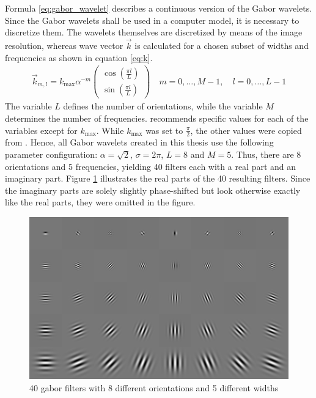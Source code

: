 \documentclass[11pt, a4paper]{article}
\begin{document}
Formula \eqref{eq:gabor_wavelet} describes a continuous version of the Gabor wavelets. Since the Gabor wavelets shall be used in a computer model, it is necessary to discretize them. The wavelets themselves are discretized by means of the image resolution, whereas wave vector $\vec{k}$ is calculated for a chosen subset of widths and frequencies as shown in equation \eqref{eq:k}. 
\begin{align}
\label{eq:k}
\vec{k}_{m,l} = k_\text{max} \alpha^{-m} \begin{pmatrix}\cos\left(\frac{\pi l}{L}\right)\\ \sin\left(\frac{\pi l}{L}\right)\end{pmatrix} \quad m = 0, \ldots, M - 1, \quad l = 0, \ldots, L-1
\end{align}
The variable $L$ defines the number of orientations, while the variable $M$ determines the number of frequencies. \cite{ebgm} recommends specific values for each of the variables except for $k_\text{max}$. While $k_\text{max}$ was set to $\frac{\pi}{2}$, the other values were copied from \cite{ebgm}. Hence, all Gabor wavelets created in this thesis use the following parameter configuration: $\alpha = \sqrt{2}$, $\sigma = 2\pi$, $L = 8$ and $M = 5$. Thus, there are 8 orientations and 5 frequencies, yielding 40 filters each with a real part and an imaginary part. Figure \ref{fig:gabor_filters} illustrates the real parts of the 40 resulting filters. Since the imaginary parts are solely slightly phase-shifted but look otherwise  exactly like the real parts, they were omitted in the figure.
\begin{figure}[htbp]
	\centering
	\includegraphics[width=\textwidth]{gabor_filters_normalized_filterwise_real.png}
	\caption{40 gabor filters with 8 different orientations and 5 different widths}
	\label{fig:gabor_filters}
\end{figure}\\
\end{document}
